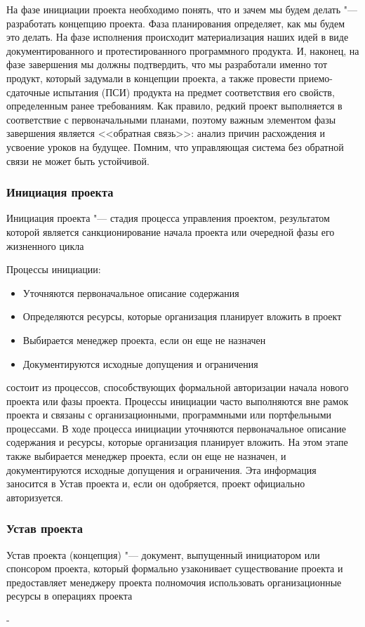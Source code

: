 \documentclass{../industrial-development}
\begin{document}
	На фазе инициации проекта необходимо понять, что и зачем мы будем делать "--- разработать концепцию проекта. Фаза планирования определяет, как мы будем это делать. На фазе исполнения происходит материализация наших идей в виде документированного и протестированного программного продукта. И, наконец, на фазе завершения мы должны подтвердить, что мы разработали именно тот продукт, который задумали в концепции проекта, а также провести приемо-сдаточные испытания (ПСИ) продукта на предмет соответствия его свойств, определенным ранее требованиям.
Как правило, редкий проект выполняется в соответствие с первоначальными планами, поэтому важным элементом фазы завершения является <<обратная связь>>: анализ причин расхождения и усвоение уроков на будущее. Помним, что управляющая система без обратной связи не может быть устойчивой.

    \begin{frame} \frametitle{Инициация проекта}
	\begin{definition}
		\alert{Инициация проекта} "--- стадия процесса управления проектом, результатом которой является санкционирование начала проекта или очередной фазы его жизненного цикла
	\end{definition}
	Процессы инициации:

	\begin{itemize}
		\item Уточняются первоначальное описание содержания
		\item Определяются ресурсы, которые организация планирует вложить в проект
		\item Выбирается менеджер проекта, если он еще не назначен
		\item Документируются исходные допущения и ограничения
	\end{itemize}
    \end{frame}
    \lecturenotes

	состоит из процессов, способствующих формальной авторизации начала нового проекта или фазы проекта. Процессы инициации часто выполняются вне рамок проекта и связаны с организационными, программными или портфельными процессами. В ходе процесса инициации уточняются первоначальное описание содержания и ресурсы, которые организация планирует вложить. На этом этапе также выбирается менеджер проекта, если он еще не назначен, и документируются исходные допущения и ограничения. Эта информация заносится в Устав проекта и, если он одобряется, проект официально авторизуется.

    \begin{frame} \frametitle{Устав проекта}
	\begin{definition}
		\alert{Устав проекта (концепция)} "--- документ, выпущенный инициатором или спонсором проекта, который формально узаконивает существование проекта и предоставляет менеджеру проекта полномочия использовать организационные ресурсы в операциях проекта
	\end{definition}
    \end{frame}
    \lecturenotes
-
\end{document}

